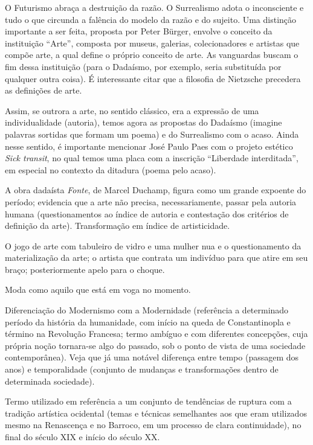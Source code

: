 O Futurismo abraça a destruição da razão. O Surrealismo adota o inconsciente e tudo o que circunda a falência do modelo da razão e do sujeito. Uma distinção importante a ser feita, proposta por Peter Bürger, envolve o conceito da instituição ``Arte'', composta por museus, galerias, colecionadores e artistas que compõe arte, a qual define o próprio conceito de arte. As vanguardas buscam o fim dessa instituição (para o Dadaísmo, por exemplo, seria substituída por qualquer outra coisa). É interessante citar que a filosofia de Nietzsche precedera as definições de arte.

Assim, se outrora a arte, no sentido clássico, era a expressão de uma individualidade (autoria), temos agora as propostas do Dadaísmo (imagine palavras sortidas que formam um poema) e do Surrealismo com o acaso. Ainda nesse sentido, é importante mencionar José Paulo Paes com o projeto estético \textit{Sick transit}, no qual temos uma placa com a inscrição ``Liberdade interditada'', em especial no contexto da ditadura (poema pelo acaso).

A obra dadaísta \textit{Fonte}, de Marcel Duchamp, figura como um grande expoente do período; evidencia que a arte não precisa, necessariamente, passar pela autoria humana (questionamentos ao índice de autoria e contestação dos critérios de definição da arte). Transformação em índice de artisticidade.

O jogo de arte com tabuleiro de vidro e uma mulher nua e o questionamento da materialização da arte; o artista que contrata um indivíduo para que atire em seu braço; posteriormente apelo para o choque.

Moda como aquilo que está em voga no momento.

Diferenciação do Modernismo com a Modernidade (referência a determinado período da história da humanidade, com início na queda de Constantinopla e término na Revolução Francesa; termo ambíguo e com diferentes concepções, cuja própria noção tornara-se algo do passado, sob o ponto de vista de uma sociedade contemporânea). Veja que já uma notável diferença entre tempo (passagem dos anos) e temporalidade (conjunto de mudanças e transformações dentro de determinada sociedade).

Termo utilizado em referência a um conjunto de tendências de ruptura com a tradição artística ocidental (temas e técnicas semelhantes aos que eram utilizados mesmo na Renascença e no Barroco, em um processo de clara continuidade), no final do século XIX e início do século XX.

